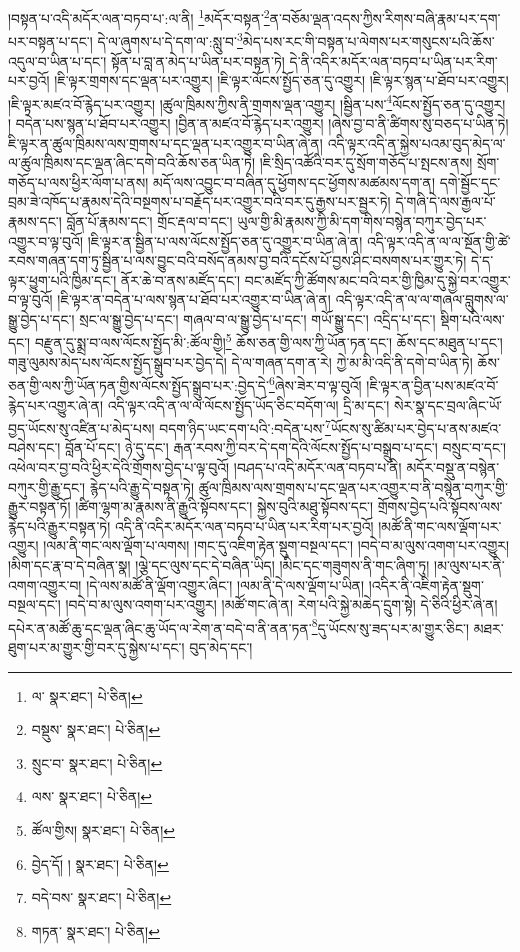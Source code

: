 །བསྟན་པ་འདི་མདོར་ལན་བཏབ་པ་:ལ་ནི། \footnote{ལ་  སྣར་ཐང་།  པེ་ཅིན། }མདོར་བསྟན་\footnote{བསྡུས་  སྣར་ཐང་།  པེ་ཅིན། }ན་བཅོམ་ལྡན་འདས་ཀྱིས་རིགས་བཞི་རྣམ་པར་དག་པར་བསྟན་པ་དང་། དེ་ལ་ཞུགས་པ་དེ་དག་ལ་:སླུ་བ་\footnote{སྲུང་བ་  སྣར་ཐང་།  པེ་ཅིན། }མེད་པས་རང་གི་བསྟན་པ་ལེགས་པར་གསུངས་པའི་ཆོས་འདུལ་བ་ཡིན་པ་དང་། སྟོན་པ་བླ་ན་མེད་པ་ཡིན་པར་བསྟན་ཏེ། དེ་ནི་འདིར་མདོར་ལན་བཏབ་པ་ཡིན་པར་རིག་པར་བྱའོ། །ཇི་ལྟར་གྲགས་དང་ལྡན་པར་འགྱུར། །ཇི་ལྟར་ལོངས་སྤྱོད་ཅན་དུ་འགྱུར། །ཇི་ལྟར་སྙན་པ་ཐོབ་པར་འགྱུར། །ཇི་ལྟར་མཛའ་བོ་རྙེད་པར་འགྱུར། །ཚུལ་ཁྲིམས་ཀྱིས་ནི་གྲགས་ལྡན་འགྱུར། །སྦྱིན་པས་\footnote{ལས་  སྣར་ཐང་།  པེ་ཅིན། }ལོངས་སྤྱོད་ཅན་དུ་འགྱུར། །
བདེན་པས་སྙན་པ་ཐོབ་པར་འགྱུར། །བྱིན་ན་མཛའ་བོ་རྙེད་པར་འགྱུར། །ཞེས་བྱ་བ་ནི་ཚིགས་སུ་བཅད་པ་ཡིན་ཏེ། ཇི་ལྟར་ན་ཚུལ་ཁྲིམས་ལས་གྲགས་པ་དང་ལྡན་པར་འགྱུར་བ་ཡིན་ཞེ་ན། འདི་ལྟར་འདི་ན་སྐྱེས་པའམ་བུད་མེད་ལ་ལ་ཚུལ་ཁྲིམས་དང་ལྡན་ཞིང་དགེ་བའི་ཆོས་ཅན་ཡིན་ཏེ། །ཇི་སྲིད་འཚོའི་བར་དུ་སྲོག་གཅོད་པ་སྤངས་ནས། སྲོག་གཅོད་པ་ལས་ཕྱིར་ལོག་པ་ནས། མདོ་ལས་འབྱུང་བ་བཞིན་དུ་ཕྱོགས་དང་ཕྱོགས་མཚམས་དག་ན། དགེ་སྦྱོང་དང་བྲམ་ཟེ་འཁོད་པ་རྣམས་དེའི་བསྔགས་པ་བརྗོད་པར་འགྱུར་བའི་བར་དུ་རྒྱས་པར་སྦྱར་ཏེ། དེ་གཞི་དེ་ལས་རྒྱལ་པོ་རྣམས་དང་། བློན་པོ་རྣམས་དང་། གྲོང་རྡལ་བ་དང་། ཡུལ་གྱི་མི་རྣམས་ཀྱི་མི་དག་གིས་བསྙེན་བཀུར་བྱེད་པར་འགྱུར་བ་ལྟ་བུའོ། །ཇི་ལྟར་ན་སྦྱིན་པ་ལས་ལོངས་སྤྱོད་ཅན་དུ་འགྱུར་བ་ཡིན་ཞེ་ན། འདི་ལྟར་འདི་ན་ལ་ལ་སྔོན་གྱི་ཚེ་རབས་གཞན་དག་ཏུ་སྦྱིན་པ་ལས་བྱུང་བའི་བསོད་ནམས་བྱ་བའི་དངོས་པོ་བྱས་ཤིང་བསགས་པར་གྱུར་ཏེ། དེ་ད་ལྟར་ཕྱུག་པའི་ཁྱིམ་དང་། ནོར་ཆེ་བ་ནས་མཛོད་དང་། བང་མཛོད་ཀྱི་ཚོགས་མང་བའི་བར་གྱི་ཁྱིམ་དུ་སྐྱེ་བར་འགྱུར་བ་ལྟ་བུའོ། །ཇི་ལྟར་ན་བདེན་པ་ལས་སྙན་པ་ཐོབ་པར་འགྱུར་བ་ཡིན་ཞེ་ན། འདི་ལྟར་འདི་ན་ལ་ལ་གཞལ་བླུགས་ལ་སྒྱུ་བྱེད་པ་དང་། སྲང་ལ་སྒྱུ་བྱེད་པ་དང་། གཞལ་བ་ལ་སྒྱུ་བྱེད་པ་དང་། གཡོ་སྒྱུ་དང་། འདྲིད་པ་དང་། སྡིག་པའི་ལས་དང་། བརྫུན་དུ་སྨྲ་བ་ལས་ལོངས་སྤྱོད་མི་:ཚོལ་གྱི།\footnote{ཚོལ་གྱིས།  སྣར་ཐང་།  པེ་ཅིན། } ཆོས་ཅན་གྱི་ལས་ཀྱི་ཡོན་ཏན་དང་། ཆོས་དང་མཐུན་པ་དང་། གཟུ་ལུམས་མེད་པས་ལོངས་སྤྱོད་སྒྲུབ་པར་བྱེད་དེ། དེ་ལ་གཞན་དག་ན་རེ། ཀྱེ་མ་མི་འདི་ནི་དགེ་བ་ཡིན་ཏེ། ཆོས་ཅན་གྱི་ལས་ཀྱི་ཡོན་ཏན་གྱིས་ལོངས་སྤྱོད་སྒྲུབ་པར་:བྱེད་དེ་\footnote{བྱེད་དོ། །  སྣར་ཐང་།  པེ་ཅིན། }ཞེས་ཟེར་བ་ལྟ་བུའོ། །ཇི་ལྟར་ན་བྱིན་པས་མཛའ་བོ་རྙེད་པར་འགྱུར་ཞེ་ན། འདི་ལྟར་འདི་ན་ལ་ལ་ལོངས་སྤྱོད་ཡོད་ཅིང་བདོག་ལ། དྲི་མ་དང་། སེར་སྣ་དང་བྲལ་ཞིང་ཡོ་བྱད་ཡོངས་སུ་འཛིན་པ་མེད་པས། བདག་ཉིད་ཡང་དག་པའི་:བདེན་པས་\footnote{བདེ་བས་  སྣར་ཐང་།  པེ་ཅིན། }ཡོངས་སུ་ཚིམ་པར་བྱེད་པ་ནས་མཛའ་བཤེས་དང་། བློན་པོ་དང་། ཉེ་དུ་དང་། རྒན་རབས་ཀྱི་བར་དེ་དག་དེའི་ལོངས་སྤྱོད་པ་བསྒྲུབ་པ་དང་། བསྲུང་བ་དང་། འཕེལ་བར་བྱ་བའི་ཕྱིར་དེའི་གྲོགས་བྱེད་པ་ལྟ་བུའོ། །བཤད་པ་འདི་མདོར་ལན་བཏབ་པ་ནི། མདོར་བསྡུ་ན་བསྙེན་བཀུར་གྱི་རྒྱུ་དང་། རྙེད་པའི་རྒྱུ་དེ་བསྟན་ཏེ། ཚུལ་ཁྲིམས་ལས་གྲགས་པ་དང་ལྡན་པར་འགྱུར་བ་ནི་བསྙེན་བཀུར་གྱི་རྒྱུར་བསྟན་ཏོ། །ཚིག་ལྷག་མ་རྣམས་ནི་རྒྱུའི་སྟོབས་དང་། སྐྱེས་བུའི་མཐུ་སྟོབས་དང་། གྲོགས་བྱེད་པའི་སྟོབས་ལས་རྙེད་པའི་རྒྱུར་བསྟན་ཏེ། འདི་ནི་འདིར་མདོར་ལན་བཏབ་པ་ཡིན་པར་རིག་པར་བྱའོ། །མཚོ་ནི་གང་ལས་ལྡོག་པར་འགྱུར། །ལམ་ནི་གང་ལས་ལྡོག་པ་ལགས། །གང་དུ་འཇིག་རྟེན་སྡུག་བསྔལ་དང་། །བདེ་བ་མ་ལུས་འགག་པར་འགྱུར། །མིག་དང་རྣ་བ་དེ་བཞིན་སྣ། །ལྕེ་དང་ལུས་དང་དེ་བཞིན་ཡིད། །མིང་དང་གཟུགས་ནི་གང་ཞིག་ཏུ། །མ་ལུས་པར་ནི་འགག་འགྱུར་བ། །དེ་ལས་མཚོ་ནི་ལྡོག་འགྱུར་ཞིང་། །ལམ་ནི་དེ་ལས་ལྡོག་པ་ཡིན། །འདིར་ནི་འཇིག་རྟེན་སྡུག་བསྔལ་དང་། །བདེ་བ་མ་ལུས་འགག་པར་འགྱུར། །མཚོ་གང་ཞེ་ན། རེག་པའི་སྐྱེ་མཆེད་དྲུག་སྟེ། དེ་ཅིའི་ཕྱིར་ཞེ་ན། དཔེར་ན་མཚོ་ཆུ་དང་ལྡན་ཞིང་ཆུ་ཡོད་ལ་རེག་ན་བདེ་བ་ནི་ནན་ཏན་\footnote{གཏན་  སྣར་ཐང་།  པེ་ཅིན། }དུ་ཡོངས་སུ་ཟད་པར་མ་གྱུར་ཅིང་། མཐར་ཐུག་པར་མ་གྱུར་གྱི་བར་དུ་སྐྱེས་པ་དང་། བུད་མེད་དང་། 